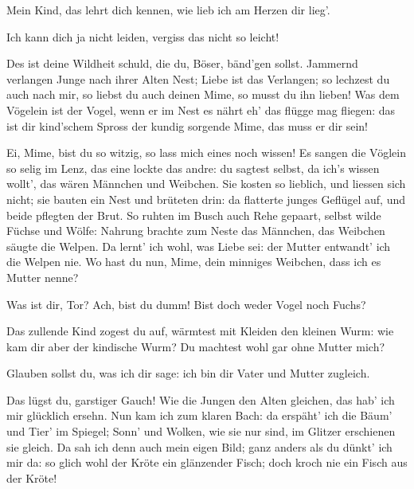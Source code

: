 \begin{drama}
Mein Kind, das lehrt dich kennen,
wie lieb ich am Herzen dir lieg'.

\Siegfriedspeaks


Ich kann dich ja nicht leiden,
vergiss das nicht so leicht!

\Mimespeaks


Des ist deine Wildheit schuld,
die du, Böser, bänd'gen sollst.
Jammernd verlangen Junge
nach ihrer Alten Nest;
Liebe ist das Verlangen;
so lechzest du auch nach mir,
so liebst du auch deinen Mime,
so musst du ihn lieben!
Was dem Vögelein ist der Vogel,
wenn er im Nest es nährt
eh' das flügge mag fliegen:
das ist dir kind'schem Spross
der kundig sorgende Mime,
das muss er dir sein!

\Siegfriedspeaks

Ei, Mime, bist du so witzig,
so lass mich eines noch wissen!
Es sangen die Vöglein
so selig im Lenz,
das eine lockte das andre:
du sagtest selbst,
da ich's wissen wollt',
das wären Männchen und Weibchen.
Sie kosten so lieblich,
und liessen sich nicht;
sie bauten ein Nest
und brüteten drin:
da flatterte junges
Geflügel auf,
und beide pflegten der Brut.
So ruhten im Busch
auch Rehe gepaart,
selbst wilde Füchse und Wölfe:
Nahrung brachte
zum Neste das Männchen,
das Weibchen säugte die Welpen.
Da lernt' ich wohl,
was Liebe sei:
der Mutter entwandt' ich
die Welpen nie.
Wo hast du nun, Mime,
dein minniges Weibchen,
dass ich es Mutter nenne?

\Mimespeaks


Was ist dir, Tor?
Ach, bist du dumm!
Bist doch weder Vogel noch Fuchs?

\Siegfriedspeaks

Das zullende Kind
zogest du auf,
wärmtest mit Kleiden
den kleinen Wurm:
wie kam dir aber
der kindische Wurm?
Du machtest wohl gar
ohne Mutter mich?

\Mimespeaks


Glauben sollst du,
was ich dir sage:
ich bin dir Vater
und Mutter zugleich.

\Siegfriedspeaks

Das lügst du, garstiger Gauch!
Wie die Jungen den Alten gleichen,
das hab' ich mir glücklich ersehn.
Nun kam ich zum klaren Bach:
da erspäht' ich die Bäum'
und Tier' im Spiegel;
Sonn' und Wolken,
wie sie nur sind,
im Glitzer erschienen sie gleich.
Da sah ich denn auch
mein eigen Bild;
ganz anders als du
dünkt' ich mir da:
so glich wohl der Kröte
ein glänzender Fisch;
doch kroch nie ein Fisch aus der Kröte!


\end{drama}
